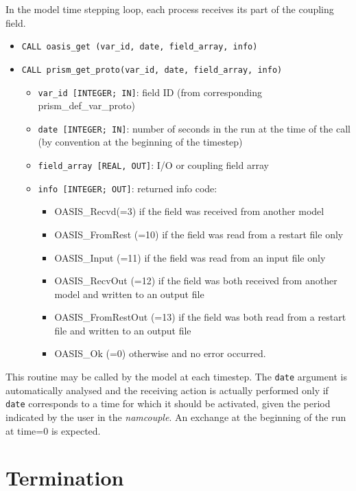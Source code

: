 In the model time stepping loop, each process
receives its part of the coupling field. 

\begin{itemize}
 
\item {\tt CALL oasis\_get       (var\_id, date, field\_array, info)}
\item {\tt CALL prism\_get\_proto(var\_id, date, field\_array, info)}
\begin{itemize}
\item {\tt var\_id [INTEGER; IN]}: field ID (from
  corresponding prism\_def\_var\_proto)
\item {\tt date [INTEGER; IN]}: number of seconds in the run at the
time of the call (by convention at the beginning of the timestep)
\item {\tt field\_array [REAL, OUT]}: I/O or coupling field array 
\item {\tt info [INTEGER; OUT]}: returned info code:
   \begin{itemize} 
      \item OASIS\_Recvd(=3) if the field was received from another model
      \item OASIS\_FromRest (=10) if the field was read from a restart
       file only
      \item OASIS\_Input (=11) if the field was read from an input
       file only
      \item OASIS\_RecvOut (=12) if the field was both received from
       another model and written to an output file
      \item OASIS\_FromRestOut (=13) if the field was both read from a
       restart file and written to an output file
      \item OASIS\_Ok (=0) otherwise and no error occurred.
   \end{itemize}
\end{itemize}
\end{itemize}

This routine may be called by the model at each timestep. The {\tt date}
argument is automatically analysed and the receiving action is actually
performed only if {\tt date} corresponds to a time for which it should
be activated, given the period indicated by the user in the
{\it namcouple}. An exchange at the beginning of the run at time=0 is
expected. 

\section{Termination}
\label{subsubsec_Termination}

